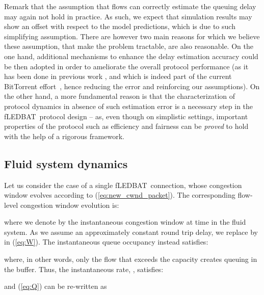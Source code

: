 \documentclass[conference]{IEEEtran}
\newcommand{\fledbat}[0]{fLEDBAT}
\begin{document}
Remark that the assumption that flows can correctly estimate the queuing delay may again not hold in practice.
As such, we expect that simulation results may show an offset with respect to the model predictions, which is due to such simplifying assumption.
There are however two main reasons for which we believe these assumption, that make the problem tractable, are also reasonable.
On the one hand, additional mechanisms to enhance the delay estimation accuracy could be then adopted in order to ameliorate the overall protocol performance (as it has been done in previous work \cite{tcp_lp}, and which is indeed part of the current BitTorrent effort~\cite{cohen10iptps}, hence reducing the error and reinforcing our assumptions). On the other hand, a more fundamental reason is that the characterization of protocol dynamics in absence of such estimation error is a necessary step in the \fledbat\ protocol design -- as, even though on simplistic settings,  important properties of the protocol such as efficiency and fairness can be \emph{proved} to hold with the help of a rigorous framework.

\subsection{Fluid system dynamics}
Let us consider the case of a single \fledbat\ connection, whose congestion window evolves according to (\ref{eq:new_cwnd_packet}).
The corresponding flow-level congestion window evolution is:

where we denote by  the instantaneous congestion window at time  in the fluid system. As we assume an approximately constant round trip delay, we
replace  by  in (\ref{eq:W}).
The instantaneous queue occupancy instead satisfies:


\noindent where, in other words, only the flow that exceeds the capacity creates queuing in the buffer.
Thus, the instantaneous rate, , satisfies:

and (\ref{eq:Q}) can be re-written as
\end{document}
